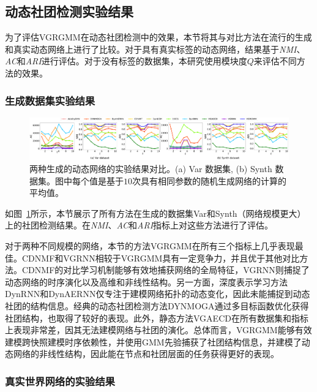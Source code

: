 \subsection{动态社团检测实验结果}



为了评估VGRGMM在动态社团检测中的效果，本节将其与对比方法在流行的生成和真实动态网络上进行了比较。对于具有真实标签的动态网络，结果基于\emph{NMI}、\emph{AC}和\emph{ARI}进行评估。对于没有标签的数据集，本研究使用模块度$Q$来评估不同方法的效果。



\subsubsection{生成数据集实验结果}

\begin{figure}[htbp]
    \centering
    \hspace{-2mm}
    \includegraphics[width=1\textwidth]{figures/chap06/chap5synthData.pdf}
    \caption{两种生成的动态网络的实验结果对比。(a) Var 数据集, (b) Synth 数据集。图中每个值是基于$10$次具有相同参数的随机生成网络的计算的平均值。}
    \label{fig:gene}
\end{figure}

如图~\ref{fig:gene}所示，本节展示了所有方法在生成的数据集Var和Synth（网络规模更大）上的社团检测结果。在\emph{NMI}、\emph{AC}和\emph{ARI}指标上对这些方法进行了评估。

对于两种不同规模的网络，本节的方法VGRGMM在所有三个指标上几乎表现最佳。CDNMF和VGRNN相较于VGRGMM具有一定竞争力，并且优于其他对比方法。CDNMF的对比学习机制能够有效地捕获网络的全局特征，VGRNN则捕捉了动态网络的时序演化以及高维和非线性结构。另一方面，深度表示学习方法DynRNN和DynAERNN仅专注于建模网络拓扑的动态变化，因此未能捕捉到动态社团的结构信息。经典的动态社团检测方法DYNMOGA通过多目标函数优化获得社团结构，也取得了较好的表现。此外，静态方法VGAECD在所有数据集和指标上表现非常差，因其无法建模网络与社团的演化。总体而言，VGRGMM能够有效建模跨快照建模时序依赖性，并使用GMM先验捕获了社团结构信息，并建模了动态网络的非线性结构，因此能在节点和社团层面的任务获得更好的表现。



\subsubsection{真实世界网络的实验结果}


